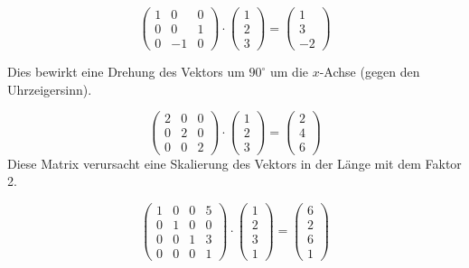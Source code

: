 \documentclass[a4paper]{scrartcl}
\begin{document}
\[
	\begin{pmatrix}
	1 & 0 & 0\\
	0 & 0 & 1 \\
	0 & -1 & 0
	\end{pmatrix}\cdot
	\begin{pmatrix}
	1 \\ 2 \\ 3 
	\end{pmatrix}=
	\begin{pmatrix}
	1 \\ 3 \\ -2
	\end{pmatrix}
\]

Dies bewirkt eine Drehung des Vektors um $90^\circ$ um die $x$-Achse (gegen den Uhrzeigersinn).

\[
	\begin{pmatrix}
	2 & 0 & 0\\
	0 & 2 & 0\\
	0 & 0 & 2
	\end{pmatrix}\cdot
	\begin{pmatrix}
	1 \\ 2 \\ 3 
	\end{pmatrix}=
	\begin{pmatrix}
	2 \\ 4 \\ 6
	\end{pmatrix}
\]
Diese Matrix verursacht eine Skalierung des Vektors in der Länge mit dem Faktor 2.

\[
	\begin{pmatrix}
	1 & 0 & 0 & 5\\
	0 & 1 & 0 & 0\\
	0 & 0 & 1 & 3\\
	0 & 0 & 0 & 1
	\end{pmatrix}\cdot
	\begin{pmatrix}
	1 \\ 2 \\ 3 \\ 1
	\end{pmatrix}=
	\begin{pmatrix}
	6 \\ 2 \\ 6 \\ 1
	\end{pmatrix}
\]
\end{document}
